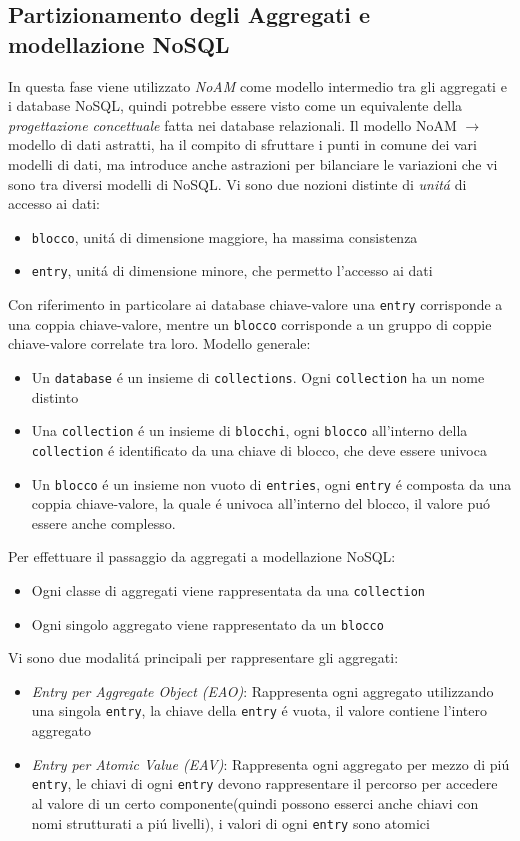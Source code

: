 \subsection{Partizionamento degli Aggregati e modellazione NoSQL}
In questa fase viene utilizzato \emph{NoAM} come modello intermedio tra gli aggregati e i database NoSQL, quindi potrebbe
essere visto come un equivalente della \emph{progettazione concettuale} fatta nei database relazionali.
Il modello NoAM $\to$ modello di dati astratti, ha il compito di sfruttare i punti in comune dei vari modelli di dati, ma
introduce anche astrazioni per bilanciare le variazioni che vi sono tra diversi modelli di NoSQL.
Vi sono due nozioni distinte di \emph{unitá} di accesso ai dati:
\begin{itemize}
    \item \texttt{blocco}, unitá di dimensione maggiore, ha massima consistenza
    \item \texttt{entry}, unitá di dimensione minore, che permetto l'accesso ai dati
\end{itemize}
Con riferimento in particolare ai database chiave-valore una \texttt{entry} corrisponde a una coppia chiave-valore, mentre
un \texttt{blocco} corrisponde a un gruppo di coppie chiave-valore correlate tra loro.
Modello generale:
\begin{itemize}
    \item Un \texttt{database} é un insieme di \texttt{collections}. Ogni \texttt{collection} ha un nome distinto\
    \item Una \texttt{collection} é un insieme di \texttt{blocchi}, ogni \texttt{blocco}
    all'interno della \texttt{collection} é identificato da una chiave di blocco, che deve essere univoca
    \item Un \texttt{blocco} é un insieme non vuoto di \texttt{entries}, ogni \texttt{entry} é composta da una coppia
    chiave-valore, la quale é univoca all'interno del blocco, il valore puó essere anche complesso.
\end{itemize}
Per effettuare il passaggio da aggregati a modellazione NoSQL:
\begin{itemize}
    \item Ogni classe di aggregati viene rappresentata da una \texttt{collection}
    \item Ogni singolo aggregato viene rappresentato da un \texttt{blocco}
\end{itemize}
Vi sono due modalitá principali per rappresentare gli aggregati:
\begin{itemize}
    \item \emph{Entry per Aggregate Object (EAO)}: Rappresenta ogni aggregato utilizzando una singola
    \texttt{entry}, la chiave della \texttt{entry} é vuota, il valore contiene l'intero aggregato 
    \item \emph{Entry per Atomic Value (EAV)}: Rappresenta ogni aggregato per mezzo di piú \texttt{entry}, le chiavi
    di ogni \texttt{entry} devono rappresentare il percorso per accedere al valore di un certo componente(quindi possono esserci anche chiavi
    con nomi strutturati a piú livelli), i valori di ogni \texttt{entry} sono atomici
\end{itemize}
